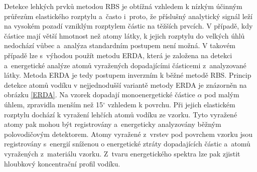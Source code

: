 \documentclass[12pt]{article}
\begin{document}
Detekce lehkých prvků metodou RBS je obtížná vzhledem k nízkým účinným průřezům elastického rozptylu a~často i~proto, že příslušný analytický signál leží na vysokém pozadí vzniklým rozptylem částic na těžších prvcích. 
V případě, kdy částice mají větší hmotnost než atomy látky, k jejich rozptylu do velkých úhlů nedochází vůbec a~analýza standardním postupem není možná. V takovém případě lze s~výhodou použít metodu ERDA, která je založena na detekci a~energetické analýze atomů vyražených dopadajícími částicemi z~ana\-ly\-zované látky. 
Metoda ERDA je tedy postupem inverzním k běžné metodě RBS. Princip detekce atomů vodíku v nejjednodušší variantě metody ERDA je znázorněn na obrázku \ref{ERDA}. Na vzorek dopadají monoenergetické částice $\alpha$ pod malým úhlem, zpravidla menším než 15$^\circ$ vzhledem k povrchu. 
Při jejich elastickém rozptylu dochází k vyražení lehčích atomů vodíku ze vzorku. Tyto vyražené atomy pak mohou být registrovány a~energeticky analyzovány běžným polovodičovým detektorem. 
Atomy vyražené z~vrstev pod povrchem vzorku jsou registrovány s~energií sníženou o energetické ztráty dopadajících částic a~atomů vyražených z~materiálu vzorku. Z~tvaru energetického spektra lze pak zjistit hloubkový koncentrační profil vodíku. 

\cleardoublepage
\end{document}
